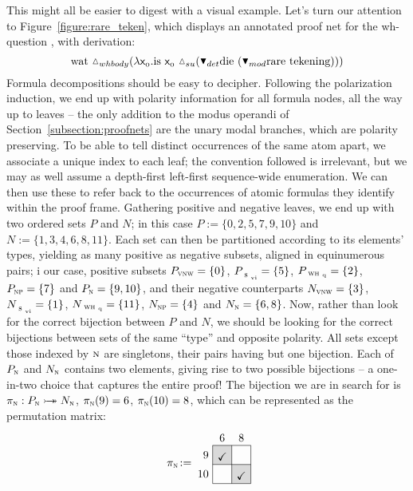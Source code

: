 This might all be easier to digest with a visual example.
Let's turn our attention to Figure~\ref{figure:rare_teken}, which displays an annotated proof net for the wh-question , with derivation:
\begin{equation}
	\w{wat}~\ddiaintro{whbody}(\lam \Var{0}.\w{is}~\Var{0}~\ddiaintro{su}(\dboxelim{det}\w{die}~(\dboxelim{mod}\w{rare}~\w{tekening})))
\end{equation}
Formula decompositions should be easy to decipher.
Following the polarization induction, we end up with polarity information for all formula nodes, all the way up to leaves -- the only addition to the modus operandi of  Section~\ref{subsection:proofnets} are the unary modal branches, which are polarity preserving.
To be able to tell distinct occurrences of the same atom apart, we associate a unique index to each leaf; the convention followed is irrelevant, but we may as well assume a depth-first left-first sequence-wide enumeration.
We can then use these to refer back to the occurrences of atomic formulas they identify within the proof frame.
Gathering positive and negative leaves, we end up with two ordered sets $P$ and $N$; in this case $P := \{ 0, 2, 5, 7, 9, 10\}$ and $N := \{ 1,3,4,6,8,11\}$.
Each set can then be partitioned according to its elements' types, yielding as many positive as negative subsets, aligned in equinumerous pairs; i our case, positive subsets $P_{\vnw[s]} = \{ 0 \}$, $P_{\svi[s]} = \{5 \}$, $P_{\whq[s]} = \{2\}$, $P_{\np[s]} = \{ 7 \}$  and $P_{\n[s]} = \{ 9, 10 \}$, and their negative counterparts $N_{\vnw[s]} = \{3\}$, $N_{\svi[s]} =\{1 \}$, $N_{\whq[s]} = \{ 11 \}$, $N_{\np[s]} = \{4\}$  and $N_{\n[s]} = \{ 6, 8\}$.
Now, rather than look for the correct bijection between $P$ and $N$, we should be looking for the correct bijections between sets of the same ``type'' and opposite polarity.
All sets except those indexed by $\n[s]$ are singletons, their pairs having but one bijection.
Each of $P_{\n[s]}$ and $N_{\n[s]}$ contains two elements, giving rise to two possible bijections -- a one-in-two choice that captures the entire proof!
The bijection we are in search for is $\pi_{\n[s]} : P_{\n[s]} \biject N_{\n[s]}$, $\pi_{\n[s]}(9)=6$, $\pi_{\n[s]}(10)=8$, which can be represented as the permutation matrix:
\begin{equation}
\begin{tikzpicture}[scale=.6]
    \fill[gray!30] (0,1) rectangle +(1,1);
    \node [above] at (0.5, 1) {\checkmark};
    \fill[gray!30] (1,0) rectangle +(1,1);
    \node [above] at (1.5, 0) {\checkmark};
    \node [above] at (0.5,2) {6};
    \node [above] at (1.5,2) {8};
    \node [left] at (0,1.5) {9};
    \node [left] at (0,0.5) {10};
    \node at (-1.75,1) {${\pi}_{\n[s]}\!:=$};
    \draw (0,0) grid (2,2);
\end{tikzpicture}
\end{equation}
